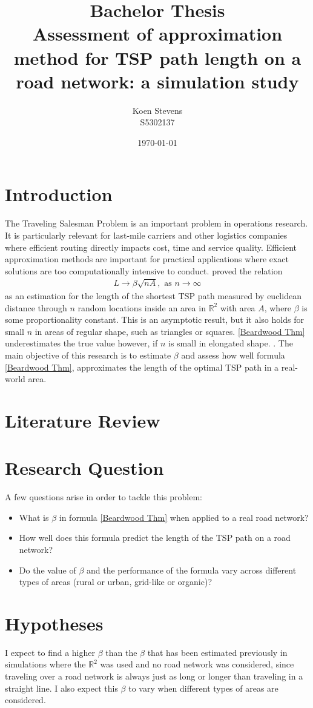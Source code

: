 \documentclass[a4paper,11pt]{article}
\title{Bachelor Thesis\\
  Assessment of approximation method for TSP path length on a road
network: a simulation study}
\author{Koen Stevens\\
S5302137}
\date{\today}
\newcommand{\1}[1]{\,I_{#1}} %
\begin{document}
\maketitle
\section{Introduction}
The Traveling Salesman Problem is an important problem in operations
research. It is particularly relevant for last-mile carriers and
other logistics companies where efficient routing directly impacts
cost, time and service quality. Efficient approximation methods are
important for practical applications where exact solutions are too
computationally intensive to conduct. \cite{beardwood1959shortest} proved the relation
\begin{align}
	L\to\beta\sqrt{nA},\text{ as }n\to\infty
	\label{Beardwood Thm}
\end{align}
as an estimation for the length of the shortest TSP path measured by
euclidean distance through $n$ random locations inside an area in
$\mathbb{R}^2$ with area $A$, where $\beta$ is some proportionality constant. This is an asymptotic 
result, but it also holds for small $n$ in areas of regular shape, such as triangles or squares.
\ref{Beardwood Thm} underestimates the true value however, if $n$ is small in elongated shape.
\cite{daganzo1984length}.
The main objective of this research is to estimate $\beta$ and assess
how well formula \ref{Beardwood Thm}, approximates the length of the
optimal TSP path in a real-world area.
\section{Literature Review}
\section{Research Question}
A few questions arise in order to tackle this problem:
\begin{itemize}
	\item What is $\beta$ in formula \ref{Beardwood Thm} when applied
	      to a real road network?
	\item How well does this formula predict the length of the TSP path
	      on a road network?
	\item Do the value of $\beta$ and the performance of the formula
	      vary across different types of areas (rural or urban, grid-like or organic)?
\end{itemize}
\section{Hypotheses}
I expect to find a higher $\beta$ than the $\beta$ that has been
estimated previously in simulations where the $\mathbb{R}^2$ was used
and no road network was considered, since traveling over a road
network is always just as long or longer than traveling in a straight
line. I also expect this $\beta$ to vary when different types of
areas are considered.
\end{document}
